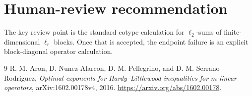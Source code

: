 \documentclass[11pt]{article}
\begin{document}
\section{Human-review recommendation}

The key review point is the standard cotype calculation for
\(\ell_2\)-sums of finite-dimensional \(\ell_r\) blocks.  Once that is
accepted, the endpoint failure is an explicit block-diagonal operator
calculation.

\begin{thebibliography}{9}
R. M. Aron, D. Nunez-Alarcon, D. M. Pellegrino, and
D. M. Serrano-Rodriguez,
\emph{Optimal exponents for Hardy--Littlewood inequalities for \(m\)-linear
operators},
arXiv:1602.00178v4, 2016.
\url{https://arxiv.org/abs/1602.00178}.
\end{thebibliography}
\end{document}
